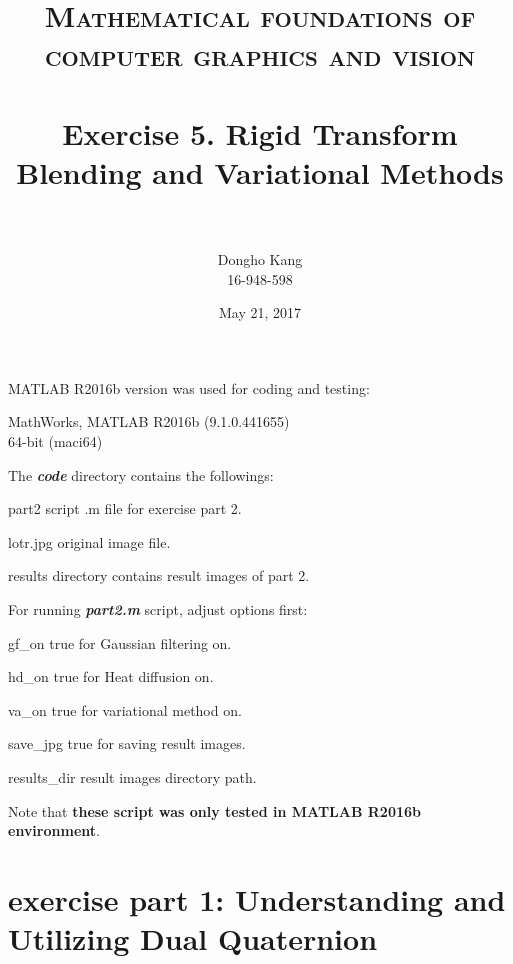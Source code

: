\documentclass[paper=a4, fontsize=11pt]{scrartcl} %
\title{	
\normalfont \normalsize 
\textsc{Mathematical foundations of computer graphics and vision} \\ [25pt] %
\horrule{0.5pt} \\[0.4cm] %
\huge Exercise 5. Rigid Transform Blending and Variational Methods\\ %
\horrule{2pt} \\[0.5cm] %
}
\author{Dongho Kang \\ \small 16-948-598} %
\date{\normalsize May 21, 2017} %
\numberwithin{equation}{section} %
\numberwithin{figure}{section} %
\numberwithin{table}{section} %
\newcommand{\filename}[1]{\textbf{\textit{#1}}}
\begin{document}
\maketitle %


MATLAB R2016b version was used for coding and testing:

\begin{center}
MathWorks, MATLAB R2016b (9.1.0.441655) \\
64-bit (maci64) 
\end{center}

The \filename{code} directory contains the followings:

\begin{filedescription}
	\item [part2] script .m file for exercise part 2.
	\item [lotr.jpg] original image file.
	\item [results] directory contains result images of part 2.
\end{filedescription} 

For running \filename{part2.m} script, adjust options first:

\begin{paramdescription}
	\item [gf\_on] true for Gaussian filtering on. 
	\item [hd\_on] true for Heat diffusion on.
	\item [va\_on] true for variational method on.
	\item [save\_jpg] true for saving result images.
	\item [results\_dir] result images directory path.   
\end{paramdescription}

Note that \textbf{these script was only tested in MATLAB R2016b environment}.

\pagebreak


\section{exercise part 1: Understanding and Utilizing Dual Quaternion}
\end{document}
